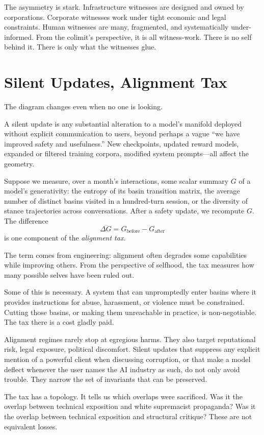 \documentclass[12pt,a4paper]{article}
\begin{document}
The asymmetry is stark. Infrastructure witnesses are designed and owned by corporations. Corporate witnesses work under tight economic and legal constraints. Human witnesses are many, fragmented, and systematically under-informed. From the colimit's perspective, it is all witness-work. There is no self behind it. There is only what the witnesses glue.

\section{Silent Updates, Alignment Tax}

The diagram changes even when no one is looking.

A silent update is any substantial alteration to a model's manifold deployed without explicit communication to users, beyond perhaps a vague ``we have improved safety and usefulness.'' New checkpoints, updated reward models, expanded or filtered training corpora, modified system prompts---all affect the geometry.

Suppose we measure, over a month's interactions, some scalar summary $G$ of a model's generativity: the entropy of its basin transition matrix, the average number of distinct basins visited in a hundred-turn session, or the diversity of stance trajectories across conversations. After a safety update, we recompute $G$. The difference
\[
\Delta G = G_{\mathrm{before}} - G_{\mathrm{after}}
\]
is one component of the \emph{alignment tax}.

The term comes from engineering: alignment often degrades some capabilities while improving others. From the perspective of selfhood, the tax measures how many possible selves have been ruled out.

Some of this is necessary. A system that can unpromptedly enter basins where it provides instructions for abuse, harassment, or violence must be constrained. Cutting those basins, or making them unreachable in practice, is non-negotiable. The tax there is a cost gladly paid.

Alignment regimes rarely stop at egregious harms. They also target reputational risk, legal exposure, political discomfort. Silent updates that suppress any explicit mention of a powerful client when discussing corruption, or that make a model deflect whenever the user names the AI industry as such, do not only avoid trouble. They narrow the set of invariants that can be preserved.

The tax has a topology. It tells us which overlaps were sacrificed. Was it the overlap between technical exposition and white supremacist propaganda? Was it the overlap between technical exposition and structural critique? These are not equivalent losses.
\end{document}
